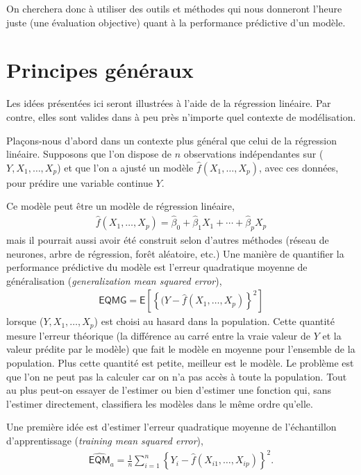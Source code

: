 \documentclass[
  11pt,
  letterpaper,
]{book}
\theoremstyle{definition}
\theoremstyle{definition}
\theoremstyle{definition}
\theoremstyle{remark}
\begin{document}
On cherchera donc à utiliser des outils et méthodes qui nous donneront l'heure juste (une évaluation objective) quant à la performance prédictive d'un modèle.

\hypertarget{principes-guxe9nuxe9raux}{%
\section{Principes généraux}\label{principes-guxe9nuxe9raux}}

Les idées présentées ici seront illustrées à l'aide de la régression linéaire. Par contre, elles sont valides dans à peu près n'importe quel contexte de modélisation.

Plaçons-nous d'abord dans un contexte plus général que celui de la régression linéaire. Supposons que l'on dispose de \(n\) observations indépendantes sur (\(Y, X_1, \ldots, X_p\)) et que l'on a ajusté un modèle \(\widehat{f}(X_1, \ldots, X_p)\), avec ces données, pour prédire une variable continue \(Y\).

Ce modèle peut être un modèle de régression linéaire,
\begin{align*}
\widehat{f}(X_1, \ldots, X_p) = \widehat{\beta}_0 + \widehat{\beta}_1X_1 + \cdots + \widehat{\beta}_pX_p
\end{align*}
mais il pourrait aussi avoir été construit selon d'autres méthodes (réseau de neurones, arbre de régression, forêt aléatoire, etc.) Une manière de quantifier la performance prédictive du modèle est l'erreur quadratique moyenne de généralisation (\emph{generalization mean squared error}),
\begin{align*}
\mathsf{EQMG}=\mathsf{E}\left[\left\{(Y-\widehat{f}(X_1, \ldots, X_p)\right\}^2\right]
\end{align*}
lorsque (\(Y, X_1, \ldots, X_p\)) est choisi au hasard dans la population. Cette quantité mesure l'erreur théorique (la différence au carré entre la vraie valeur de \(Y\) et la valeur prédite par le modèle) que fait le modèle en moyenne pour l'ensemble de la population. Plus cette quantité est petite, meilleur est le modèle. Le problème est que l'on ne peut pas la calculer car on n'a pas accès à toute la population. Tout au plus peut-on essayer de l'estimer ou bien d'estimer une fonction qui, sans l'estimer directement, classifiera les modèles dans le même ordre qu'elle.

Une première idée est d'estimer l'erreur quadratique moyenne de l'échantillon d'apprentissage (\emph{training mean squared error}),
\begin{align*}
\widehat{\mathsf{EQM}}_a= \frac{1}{n}\sum_{i=1}^n \left\{Y_i-\widehat{f}(X_{i1}, \ldots, X_{ip})\right\}^2.
\end{align*}
\end{document}
